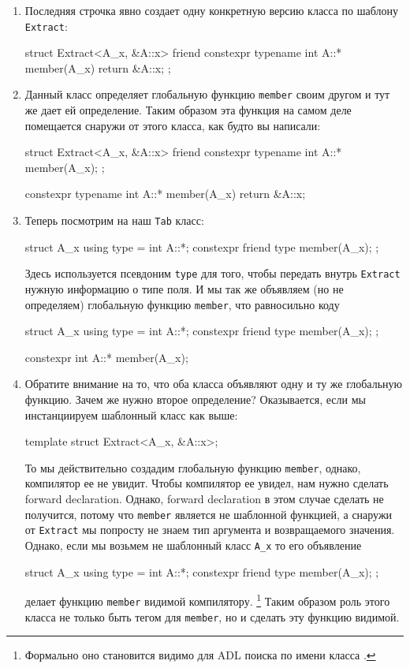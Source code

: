 \begin{enumerate}
\item Последняя строчка явно создает одну конкретную версию класса по шаблону \verb"Extract":
\begin{cppcode}[\nonumbers]
struct Extract<A_x, &A::x> {
  friend constexpr typename int A::* member(A_x) {
    return &A::x;
  }
};
\end{cppcode}

\item Данный класс определяет глобальную функцию \verb"member" своим другом и тут же дает ей определение.
Таким образом эта функция на самом деле помещается снаружи от этого класса, как будто вы написали:
\begin{cppcode}[\nonumbers]
struct Extract<A_x, &A::x> {
  friend constexpr typename int A::* member(A_x);
};

constexpr typename int A::* member(A_x) {
  return &A::x;
}
\end{cppcode}

\item Теперь посмотрим на наш \verb"Tab" класс:
\begin{cppcode}[\nonumbers]
struct A_x {
  using type = int A::*;
  constexpr friend type member(A_x);
};
\end{cppcode}
Здесь используется псевдоним \verb"type" для того, чтобы передать внутрь \verb"Extract" нужную информацию о типе поля.
И мы так же объявляем (но не определяем) глобальную функцию \verb"member", что равносильно коду
\begin{cppcode}[\nonumbers]
struct A_x {
  using type = int A::*;
  constexpr friend type member(A_x);
};

constexpr int A::* member(A_x);
\end{cppcode}

\item Обратите внимание на то, что оба класса объявляют одну и ту же глобальную функцию.
Зачем же нужно второе определение?
Оказывается, если мы инстанциируем шаблонный класс как выше:
\begin{cppcode}[\nonumbers]
template struct Extract<A_x, &A::x>;
\end{cppcode}
То мы действительно создадим глобальную функцию \verb"member", однако, компилятор ее не увидит.
Чтобы компилятор ее увидел, нам нужно сделать forward declaration.
Однако, forward declaration в этом случае сделать не получится, потому что \verb"member" является не шаблонной функцией, а снаружи от \verb"Extract" мы попросту не знаем тип аргумента и возвращаемого значения.
Однако, если мы возьмем не шаблонный класс \verb"A_x" то его объявление 
\begin{cppcode}[\nonumbers]
struct A_x {
  using type = int A::*;
  constexpr friend type member(A_x);
};
\end{cppcode}
делает функцию \verb"member" видимой компилятору.%
\footnote{Формально оно становится видимо для ADL поиска по имени класса .}
Таким образом роль этого класса не только быть тегом для \verb"member", но и сделать эту функцию видимой.
\end{enumerate}
